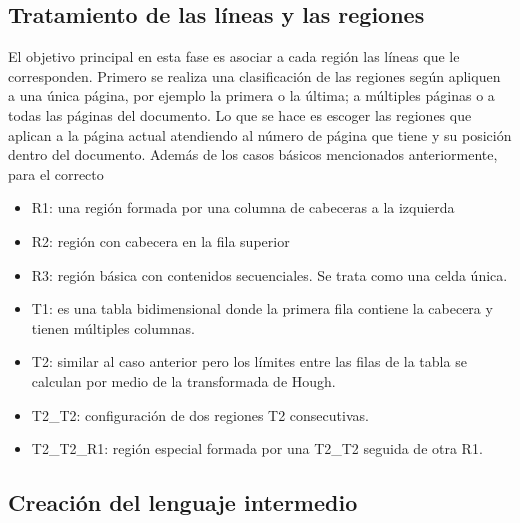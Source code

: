 \subsection{Tratamiento de las líneas y las regiones}

El objetivo principal en esta fase es asociar a cada región las líneas que le corresponden. Primero se realiza una clasificación de las regiones según apliquen a una única página, por ejemplo la primera o la última; a múltiples páginas o a todas las páginas del documento. Lo que se hace es escoger las regiones que aplican a la página actual atendiendo al número de página que tiene y su posición dentro del documento. Además de los casos básicos mencionados anteriormente, para el correcto %

\begin{itemize}
    \item R1: una región formada por una columna de cabeceras a la izquierda
    \item R2: región con cabecera en la fila superior
    \item R3: región básica con contenidos secuenciales. Se trata como una celda única.
    \item T1: es una tabla bidimensional donde la primera fila contiene la cabecera y tienen múltiples columnas.
    \item T2: similar al caso anterior pero los límites entre las filas de la tabla se calculan por medio de la transformada de Hough.
    \item T2\_T2: configuración de dos regiones T2 consecutivas.
    \item T2\_T2\_R1: región especial formada por una T2\_T2 seguida de otra R1.
\end{itemize}





\subsection{Creación del lenguaje intermedio}

